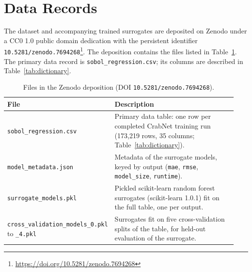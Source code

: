 \documentclass[pdflatex,sn-mathphys-num]{sn-jnl}
\begin{document}
\section{Data Records}\label{sec:data-records}

The dataset and accompanying trained surrogates are deposited on Zenodo under a CC0 1.0 public domain dedication with the persistent identifier \texttt{10.5281/zenodo.7694268}\footnote{\url{https://doi.org/10.5281/zenodo.7694268}}. The deposition contains the files listed in Table~\ref{tab:records}. The primary data record is \texttt{sobol\_regression.csv}; its columns are described in Table~\ref{tab:dictionary}.

\begin{table}[h]
\caption{Files in the Zenodo deposition (DOI \texttt{10.5281/zenodo.7694268}).}\label{tab:records}
\begin{tabular}{@{}p{0.32\linewidth}p{0.62\linewidth}@{}}
\toprule
\textbf{File} & \textbf{Description} \\
\midrule
\texttt{sobol\_regression.csv} & Primary data table: one row per completed CrabNet training run (173,219 rows, 35 columns; Table~\ref{tab:dictionary}). \\
\texttt{model\_metadata.json} & Metadata of the surrogate models, keyed by output (\texttt{mae}, \texttt{rmse}, \texttt{model\_size}, \texttt{runtime}). \\
\texttt{surrogate\_models.pkl} & Pickled scikit-learn random forest surrogates (scikit-learn 1.0.1) fit on the full table, one per output. \\
\texttt{cross\_validation\_models\_0.pkl} to \texttt{\_4.pkl} & Surrogates fit on five cross-validation splits of the table, for held-out evaluation of the surrogate. \\
\bottomrule
\end{tabular}
\end{table}
\end{document}
